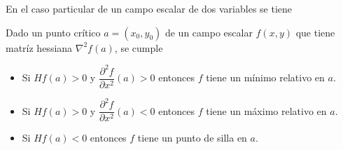 En el caso particular de un campo escalar de dos variables se tiene
\begin{teorema}
Dado un punto crítico $a=(x_0,y_0)$ de un campo escalar $f(x,y)$ que tiene matríz hessiana $\nabla^2f(a)$, se cumple
\begin{itemize}
\item Si $Hf(a)>0$ y $\dfrac{\partial^2 f}{\partial x^2}(a)>0$ entonces $f$ tiene un mínimo relativo en $a$.
\item Si $Hf(a)>0$ y $\dfrac{\partial^2 f}{\partial x^2}(a)<0$ entonces $f$ tiene un máximo relativo en $a$.
\item Si $Hf(a)<0$ entonces $f$ tiene un punto de silla en $a$.
\end{itemize}
\end{teorema}

\newpage

